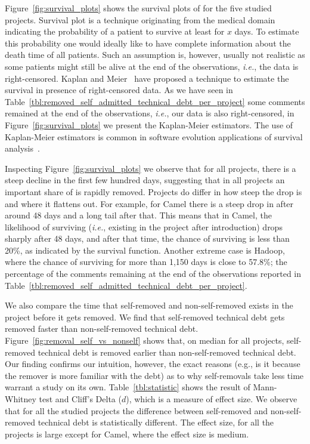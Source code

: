 Figure~\ref{fig:survival_plots} shows the survival plots of \SATD for the five studied projects. Survival plot is a technique originating from the medical domain indicating the probability of a patient to survive at least for $x$ days. To estimate this probability one would ideally like to 
have complete information about the death time of all patients. Such an assumption is, however, usually not realistic as some patients might still be alive at the end of the observations, \emph{i.e.}, the data is right-censored. Kaplan and Meier~\cite{kaplan1958nonparametric} have proposed a technique to estimate the survival in presence of right-censored data. As we have seen in Table~\ref{tbl:removed_self_admitted_technical_debt_per_project} some \SATD comments remained at the end of the observations, \emph{i.e.}, our data is also right-censored, in Figure~\ref{fig:survival_plots} we present the Kaplan-Meier estimators. The use of Kaplan-Meier estimators is common in software evolution applications of survival analysis~\cite{samoladas2010survival,goeminne2015towards,Lin:et:al}.

Inspecting Figure~\ref{fig:survival_plots} we observe that for all projects, there is a steep decline in the first few hundred days, suggesting that in all projects an important share of \SATD is rapidly removed. Projects do differ in how steep the drop is and where it flattens out. For example, for Camel  there is a steep drop in \SATD after around 48 days and a long tail after that. This means that in Camel, the likelihood of \SATD surviving (\emph{i.e.}, existing in the project after introduction) drops sharply after 48 days, and after that time, the chance of surviving is less than 20\%, as indicated by the survival function. Another extreme case is Hadoop, where the chance of \SATD surviving for more than 1,150 days is close to 57.8\%; the percentage
of the \SATD comments remaining at the end of the observations reported in Table~\ref{tbl:removed_self_admitted_technical_debt_per_project}. 




We also compare the time that self-removed and non-self-removed \SATD exists in the project before it gets removed. We find that self-removed technical debt gets removed faster than non-self-removed technical debt. Figure~\ref{fig:removal_self_vs_nonself} shows that, on median for all projects, self-removed technical debt is removed earlier than non-self-removed technical debt. Our finding confirms our intuition, however, the exact reasons (e.g., is it because the remover is more familiar with the debt) as to why self-removals take less time warrant a study on its own. Table~\ref{tbl:statistic} shows the result of  Mann-Whitney test and Cliff's Delta ($d$), which is a measure of effect size. We observe that for all the studied projects the difference between self-removed and non-self-removed technical debt is statistically different. The effect size, for all the projects is large except for Camel, where the effect size is medium.

